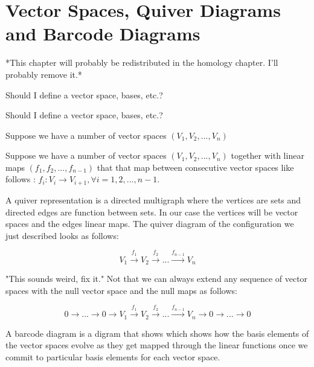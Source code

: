 






\section{Vector Spaces, Quiver Diagrams and Barcode Diagrams}

*This chapter will probably be redistributed in the homology chapter. I'll probably remove it.*

Should I define a vector space, bases, etc.?

Should I define a vector space, bases, etc.?


Suppose we have a number of vector spaces $(V_1, V_2, ...,V_n)$

Suppose we have a number of vector spaces $(V_1, V_2, ...,V_n)$ together with linear maps $(f_1, f_2, ...,f_{n-1})$ that that map between consecutive vector spaces like follows : $f_i: V_i \to V_{i+1}, \forall i = 1, 2, ..., n -1$. 

A quiver representation is a directed multigraph where the vertices are sets and directed edges are function between sets. In our case the vertices will be vector spaces and the edges linear maps. The quiver diagram of the configuration we just described looks as follows:

$$V_1 \overset{f_1}{\longrightarrow} V_2 \overset{f_2}{\longrightarrow} ... \overset{f_{n-1}}{\longrightarrow} V_n  $$


"This sounds weird, fix it."
Not that we can always extend any sequence of vector spaces with the null vector space and the null maps as follows:

$$ 0 \longrightarrow ... \longrightarrow 0 \longrightarrow V_1 \overset{f_1}{\longrightarrow} V_2 \overset{f_2}{\longrightarrow} ... \overset{f_{n-1}}{\longrightarrow} V_n  \longrightarrow 0 \longrightarrow ... \longrightarrow 0$$

A barcode diagram is a digram that shows which shows how the basis elements of the vector spaces evolve as they get mapped through the linear functions once we commit to particular basis elements for each vector space.

